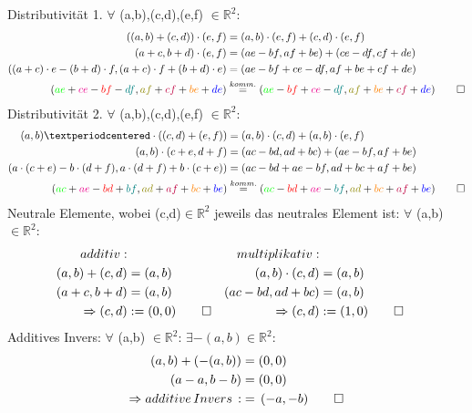 \documentclass[titlepage]{article}
\begin{document}
	Distributivität 1. $\forall$ (a,b),(c,d),(e,f) $\in \mathbb{R}^2$:
	\begin{align*}
		((a,b)+(c,d))\cdot (e,f) &= (a,b)\cdot (e,f)+(c,d)\cdot (e,f)\\
		(a+c,b+d)\cdot (e,f) &= (ae-bf,af+be)+(ce-df,cf+de)\\
		((a+c)\cdot e-(b+d)\cdot f,(a+c)\cdot f+(b+d)\cdot e) &= (ae-bf+ce-df,af+be+cf+de)\\
		(\textcolor{green}{ae}+\textcolor{magenta}{ce}-\textcolor{red}{bf}-\textcolor{teal}{df},\textcolor{olive}{af}+\textcolor{purple}{cf}+\textcolor{orange}{be}+\textcolor{blue}{de}) &\overset{komm.}{=} (\textcolor{green}{ae}-\textcolor{red}{bf}+\textcolor{magenta}{ce}-\textcolor{teal}{df},\textcolor{olive}{af}+\textcolor{orange}{be}+\textcolor{purple}{cf}+\textcolor{blue}{de}) \qed
	\end{align*}
	Distributivität 2. $\forall$ (a,b),(c,d),(e,f) $\in \mathbb{R}^2$:
	\begin{align*}
		(a,b)·\cdot((c,d)+(e,f)) &= (a,b)\cdot(c,d)+(a,b)\cdot(e,f)\\
		(a,b)\cdot (c+e,d+f) &= (ac-bd,ad+bc)+(ae-bf,af+be)\\
		(a\cdot(c+e)-b\cdot(d+f),a\cdot(d+f)+b\cdot(c+e)) &= (ac-bd+ae-bf,ad+bc+af+be)\\
		(\textcolor{green}{ac}+\textcolor{magenta}{ae}-\textcolor{red}{bd}+\textcolor{teal}{bf},\textcolor{olive}{ad}+\textcolor{purple}{af}+\textcolor{orange}{bc}+\textcolor{blue}{be}) &\overset{komm.}{=} (\textcolor{green}{ac}-\textcolor{red}{bd}+\textcolor{magenta}{ae}-\textcolor{teal}{bf},\textcolor{olive}{ad}+\textcolor{orange}{bc}+\textcolor{purple}{af}+\textcolor{blue}{be}) \qed
	\end{align*}
	Neutrale Elemente, wobei (c,d)$\in \mathbb{R}^2$ jeweils das neutrales Element ist: $\forall$ (a,b)$\in \mathbb{R}^2$:
	\begin{align*}
		additiv:& &multiplikativ:\\
		(a,b)+(c,d) &= (a,b) &(a,b)\cdot (c,d) &= (a,b)\\
		(a+c,b+d) &= (a,b) &(ac-bd,ad+bc) &=(a,b)\\
		\Rightarrow (c,d)&:=(0,0) \qed &\Rightarrow (c,d)&:=(1,0) \qed
	\end{align*}
	Additives Invers: $\forall$ (a,b) $\in \mathbb{R}^2$: $\exists -(a,b) \in \mathbb{R}^2:$
	\begin{align*}
		(a,b)+(-(a,b)) &= (0,0)\\
		(a-a,b-b) &= (0,0)\\
		\Rightarrow additive\,Invers\,:&=\,(-a,-b) \qed
	\end{align*}
\end{document}
